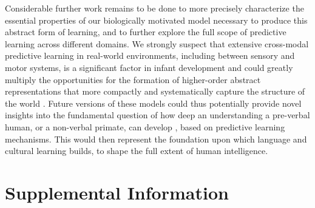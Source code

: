 \documentclass[11pt,twoside]{article}
\newif\myifpdf
\begin{document}



Considerable further work remains to be done to more precisely characterize the essential properties of our biologically motivated model necessary to produce this abstract form of learning, and to further explore the full scope of predictive learning across different domains.  We strongly suspect that extensive cross-modal predictive learning in real-world environments, including between sensory and motor systems, is a significant factor in infant development and could greatly multiply the opportunities for the formation of higher-order abstract representations that more compactly and systematically capture the structure of the world \citep{YuSmith12}.  Future versions of these models could thus potentially provide novel insights into the fundamental question of how deep an understanding a pre-verbal human, or a non-verbal primate, can develop \citep{SpelkeBreinlingerMacomberEtAl92,ElmanBatesKarmiloff-SmithEtAl96}, based on predictive learning mechanisms.  This would then represent the foundation upon which language and cultural learning builds, to shape the full extent of human intelligence.

\clearpage

\section{Supplemental Information}



\clearpage


\end{document}
